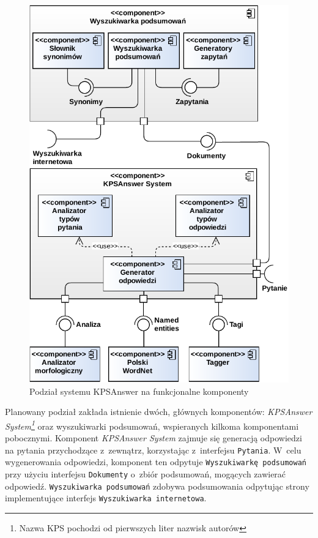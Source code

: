 \begin{figure}[h]
    \centering
    \includegraphics[width=\columnwidth]{figures/WEDT-Komponenty.pdf}
    \caption{Podział systemu KPSAnswer na funkcjonalne komponenty}
    \label{fig:system-components}
\end{figure}

Planowany podział zakłada istnienie dwóch, głównych komponentów:
\emph{KPSAnswer System\footnote{Nazwa KPS pochodzi od pierwszych liter nazwisk autorów}} oraz wyszukiwarki podsumowań, wspieranych kilkoma komponentami pobocznymi.
Komponent \emph{KPSAnswer System} zajmuje się generacją odpowiedzi na pytania przychodzące z~zewnątrz, korzystając z~interfejsu \texttt{Pytania}. W~celu wygenerowania odpowiedzi, komponent ten odpytuje \texttt{Wyszukiwarkę podsumowań} przy użyciu interfejsu \texttt{Dokumenty} o~zbiór podsumowań, mogących zawierać odpowiedź. \texttt{Wyszukiwarka podsumowań} zdobywa podsumowania odpytując strony implementujące interfejs \texttt{Wyszukiwarka internetowa}.

